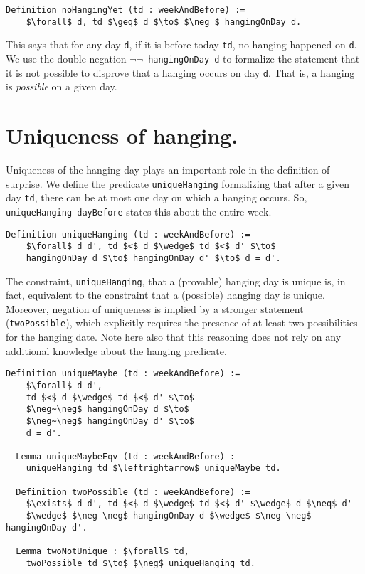 \documentclass[runningheads]{llncs}
\begin{document}
\begin{lstlisting}[mathescape=true]
  Definition noHangingYet (td : weekAndBefore) :=
    $\forall$ d, td $\geq$ d $\to$ $\neg $ hangingOnDay d.
\end{lstlisting}

This says that for any day {\tt d}, if it is before today {\tt td}, no hanging
happened on {\tt d}.
We use the double negation {\tt $\neg \neg$ hangingOnDay d} to formalize the statement that it is
not possible to disprove that a hanging occurs on day {\tt d}. That is, a hanging
is \emph{possible} on a given day.

\section{Uniqueness of hanging. }
\label{sec:unique}

Uniqueness of the hanging day plays an important role in the definition of surprise.
We define the predicate {\tt uniqueHanging} formalizing that after a given day {\tt td},
there can be at most one day on which a hanging occurs. So,
{\tt uniqueHanging dayBefore} states this about the entire week.

\begin{lstlisting}[mathescape=true]
  Definition uniqueHanging (td : weekAndBefore) :=
    $\forall$ d d', td $<$ d $\wedge$ td $<$ d' $\to$
    hangingOnDay d $\to$ hangingOnDay d' $\to$ d = d'.
\end{lstlisting}

The constraint, {\tt uniqueHanging}, that
a (provable) hanging day is unique is, in fact, equivalent to the constraint
that a (possible) hanging day is unique. Moreover, negation of uniqueness
is implied by a stronger statement ({\tt twoPossible}), which explicitly
requires the presence of at least two possibilities for the hanging date.
Note here also that this reasoning does not rely on any additional knowledge about
the hanging predicate.

\begin{lstlisting}[mathescape=true]
  Definition uniqueMaybe (td : weekAndBefore) :=
    $\forall$ d d',
    td $<$ d $\wedge$ td $<$ d' $\to$
    $\neg~\neg$ hangingOnDay d $\to$
    $\neg~\neg$ hangingOnDay d' $\to$
    d = d'.

  Lemma uniqueMaybeEqv (td : weekAndBefore) :
    uniqueHanging td $\leftrightarrow$ uniqueMaybe td.

  Definition twoPossible (td : weekAndBefore) :=
    $\exists$ d d', td $<$ d $\wedge$ td $<$ d' $\wedge$ d $\neq$ d'
    $\wedge$ $\neg \neg$ hangingOnDay d $\wedge$ $\neg \neg$ hangingOnDay d'.

  Lemma twoNotUnique : $\forall$ td,
    twoPossible td $\to$ $\neg$ uniqueHanging td.
\end{lstlisting}
\end{document}
